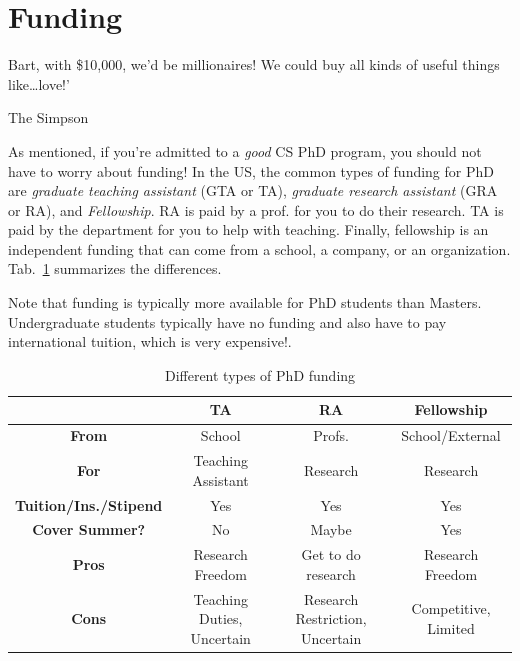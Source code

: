 \documentclass[11pt]{article}
\begin{document}
\section{Funding}\label{sec:funding}

\epigraph{Bart, with \$10,000, we’d be millionaires! We could buy all kinds of useful things like…love!’}{The Simpson}

As mentioned, if you're admitted to a \emph{good} CS PhD program, you should not have to worry about funding!  
In the US, the common types of funding for PhD are \emph{graduate teaching assistant} (GTA or TA), \emph{graduate research assistant} (GRA or RA), and \emph{Fellowship}.
RA is paid by a prof. for you to do their research. TA is paid by the department for you to help with teaching. Finally, fellowship is an independent funding that can come from a school, a company, or an organization. Tab.~\ref{tab:funding} summarizes the differences.


Note that funding is typically more available for PhD students than 
Masters. Undergraduate students typically have no funding and also have to pay international tuition, which is very expensive!.  

\begin{table}
  \centering
  \footnotesize
  \caption{Different types of PhD funding}\label{tab:funding}
  \begin{tabular}{c|c|c|c}
    \toprule
    &\textbf{TA}&\textbf{RA}&\textbf{Fellowship}\\
    \midrule
    \textbf{From} & School & Profs. & School/External\\
    \textbf{For}                  & Teaching Assistant       & Research                        & Research                              \\
    \textbf{Tuition/Ins./Stipend} & Yes                      & Yes                             & Yes                                   \\
    \textbf{Cover Summer?}              & No                       & Maybe                           & Yes                                   \\
    \midrule
    \textbf{Pros}                 & Research Freedom         & Get to do research              & Research Freedom                      \\
    \textbf{Cons}                 & Teaching Duties, Uncertain            & Research Restriction, Uncertain & Competitive, Limited             \\
    \bottomrule
  \end{tabular}
\end{table}
\end{document}
